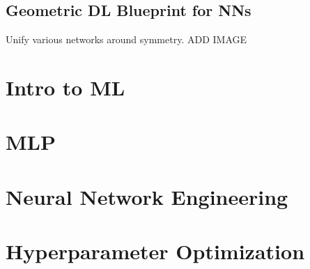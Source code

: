 \documentclass{article}
\begin{document}
\subsection{Geometric DL Blueprint for NNs}
\begin{summary}
    Unify various networks around symmetry. 
    ADD IMAGE
\end{summary}
\newpage

\section{Intro to ML}

\newpage

\section{MLP}

\newpage

\section{Neural Network Engineering}

\newpage

\section{Hyperparameter Optimization}

\end{document}
